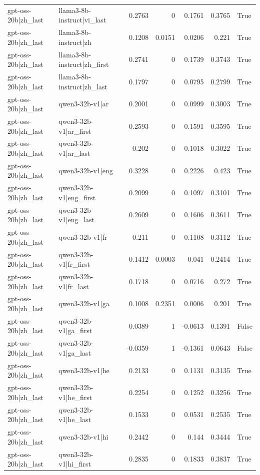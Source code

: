 \begin{table}
\begin{tabular}{l l r r r r l}
gpt-oss-20b|zh_last & llama3-8b-instruct|vi_last & 0.2763 & 0 & 0.1761 & 0.3765 & True \\
gpt-oss-20b|zh_last & llama3-8b-instruct|zh & 0.1208 & 0.0151 & 0.0206 & 0.221 & True \\
gpt-oss-20b|zh_last & llama3-8b-instruct|zh_first & 0.2741 & 0 & 0.1739 & 0.3743 & True \\
gpt-oss-20b|zh_last & llama3-8b-instruct|zh_last & 0.1797 & 0 & 0.0795 & 0.2799 & True \\
gpt-oss-20b|zh_last & qwen3-32b-v1|ar & 0.2001 & 0 & 0.0999 & 0.3003 & True \\
gpt-oss-20b|zh_last & qwen3-32b-v1|ar_first & 0.2593 & 0 & 0.1591 & 0.3595 & True \\
gpt-oss-20b|zh_last & qwen3-32b-v1|ar_last & 0.202 & 0 & 0.1018 & 0.3022 & True \\
gpt-oss-20b|zh_last & qwen3-32b-v1|eng & 0.3228 & 0 & 0.2226 & 0.423 & True \\
gpt-oss-20b|zh_last & qwen3-32b-v1|eng_first & 0.2099 & 0 & 0.1097 & 0.3101 & True \\
gpt-oss-20b|zh_last & qwen3-32b-v1|eng_last & 0.2609 & 0 & 0.1606 & 0.3611 & True \\
gpt-oss-20b|zh_last & qwen3-32b-v1|fr & 0.211 & 0 & 0.1108 & 0.3112 & True \\
gpt-oss-20b|zh_last & qwen3-32b-v1|fr_first & 0.1412 & 0.0003 & 0.041 & 0.2414 & True \\
gpt-oss-20b|zh_last & qwen3-32b-v1|fr_last & 0.1718 & 0 & 0.0716 & 0.272 & True \\
gpt-oss-20b|zh_last & qwen3-32b-v1|ga & 0.1008 & 0.2351 & 0.0006 & 0.201 & True \\
gpt-oss-20b|zh_last & qwen3-32b-v1|ga_first & 0.0389 & 1 & -0.0613 & 0.1391 & False \\
gpt-oss-20b|zh_last & qwen3-32b-v1|ga_last & -0.0359 & 1 & -0.1361 & 0.0643 & False \\
gpt-oss-20b|zh_last & qwen3-32b-v1|he & 0.2133 & 0 & 0.1131 & 0.3135 & True \\
gpt-oss-20b|zh_last & qwen3-32b-v1|he_first & 0.2254 & 0 & 0.1252 & 0.3256 & True \\
gpt-oss-20b|zh_last & qwen3-32b-v1|he_last & 0.1533 & 0 & 0.0531 & 0.2535 & True \\
gpt-oss-20b|zh_last & qwen3-32b-v1|hi & 0.2442 & 0 & 0.144 & 0.3444 & True \\
gpt-oss-20b|zh_last & qwen3-32b-v1|hi_first & 0.2835 & 0 & 0.1833 & 0.3837 & True \\

\end{tabular}
\end{table}
